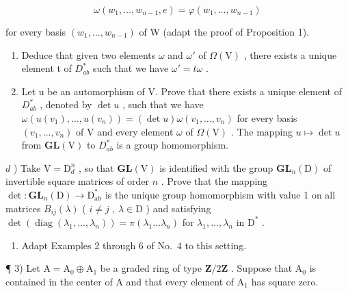 \[
\omega (w _ {1}, \dots , w _ {n - 1}, e) = \varphi (w _ {1}, \dots , w _ {n - 1})
\]

for every basis \((w_{1},\ldots ,w_{n - 1})\) of W (adapt the proof of Proposition 1).

\begin{enumerate}
\def\labelenumi{\alph{enumi})}
\setcounter{enumi}{1}
\item
  Deduce that given two elements \(\omega\) and \(\omega'\) of \(\Omega(\mathrm{V})\) , there exists a unique element t of \(D_{ab}^{*}\) such that we have \(\omega' = t\omega\) .
\item
  Let u be an automorphism of V. Prove that there exists a unique element of \(D_{ab}^{*}\) , denoted by \(\det u\) , such that we have \(\omega(u(v_{1}),\ldots,u(v_{n}))=(\det u)\omega(v_{1},\ldots,v_{n})\) for every basis \((v_{1},\ldots,v_{n})\) of V and every element \(\omega\) of \(\Omega(\mathrm{V})\) . The mapping \(u\mapsto\det u\) from \(\mathbf{GL}(\mathrm{V})\) to \(D_{ab}^{*}\) is a group homomorphism.
\end{enumerate}

\(d\) ) Take \(\mathrm{V} = \mathrm{D}_d^n\) , so that \(\mathbf{GL}(\mathrm{V})\) is identified with the group \(\mathbf{GL}_n(\mathrm{D})\) of invertible square matrices of order \(n\) . Prove that the mapping \(\operatorname{det}:\mathbf{GL}_n(\mathrm{D})\to \mathrm{D}_{\mathrm{ab}}^*\) is the unique group homomorphism with value 1 on all matrices \(B_{ij}(\lambda)\) ( \(i\neq j\) , \(\lambda \in \mathrm{D}\) ) and satisfying \(\operatorname{det}(\operatorname{diag}(\lambda_1,\dots ,\lambda_n)) = \pi (\lambda_1\dots \lambda_n)\) for \(\lambda_1,\ldots ,\lambda_n\) in \(\mathrm{D}^*\) .

\begin{enumerate}
\def\labelenumi{\alph{enumi})}
\setcounter{enumi}{4}
\tightlist
\item
  Adapt Examples 2 through 6 of No.~4 to this setting.
\end{enumerate}

¶ 3) Let \(\mathrm{A} = \mathrm{A}_0 \oplus \mathrm{A}_1\) be a graded ring of type \(\mathbf{Z}/2\mathbf{Z}\) . Suppose that \(\mathrm{A}_0\) is contained in the center of \(\mathrm{A}\) and that every element of \(\mathrm{A}_1\) has square zero.

